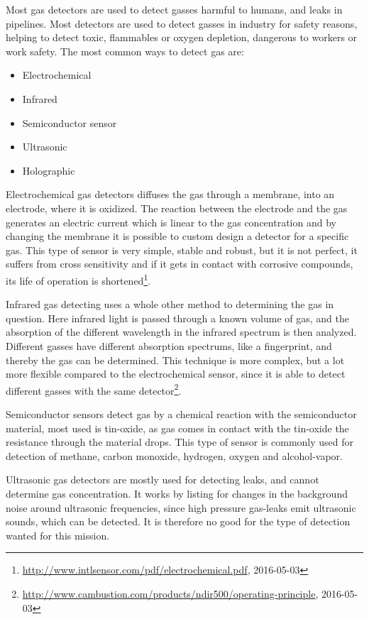 Most gas detectors are used to detect gasses harmful to humans, and leaks in pipelines. Most detectors are used to detect gasses in industry for safety reasons, helping to detect toxic, flammables or oxygen depletion, dangerous to workers or work safety. The most common ways to detect gas are:
\begin{itemize}
  \item Electrochemical
  \item Infrared
  \item Semiconductor sensor
  \item Ultrasonic
  \item Holographic
\end{itemize}
Electrochemical gas detectors diffuses the gas through a membrane, into an electrode, where it is oxidized. The reaction between the electrode and the gas generates an electric current which is linear to the gas concentration and by changing the membrane it is possible to custom design a detector for a specific gas. This type of sensor is very simple, stable and robust, but it is not perfect, it suffers from cross sensitivity and if it gets in contact with corrosive compounds, its life of operation is shortened\footnote{\url{http://www.intlsensor.com/pdf/electrochemical.pdf}, 2016-05-03}.

Infrared gas detecting uses a whole other method to determining the gas in question. Here infrared light is passed through a known volume of gas, and the absorption of the different wavelength in the infrared spectrum is then analyzed. Different gasses have different absorption spectrums, like a fingerprint, and thereby the gas can be determined. This technique is more complex, but a lot more flexible compared to the electrochemical sensor, since it is able to detect different gasses with the same detector\footnote{\url{http://www.cambustion.com/products/ndir500/operating-principle}, 2016-05-03}.

Semiconductor sensors detect gas by a chemical reaction with the semiconductor material, most used is tin-oxide, as gas comes in contact with the tin-oxide the resistance through the material drops. This type of sensor is commonly used for detection of methane, carbon monoxide, hydrogen, oxygen and alcohol-vapor.

Ultrasonic gas detectors are mostly used for detecting leaks, and cannot determine gas concentration. It works by listing for changes in the background noise around ultrasonic frequencies, since high pressure gas-leaks emit ultrasonic sounds, which can be detected. It is therefore no good for the type of detection wanted for this mission.

